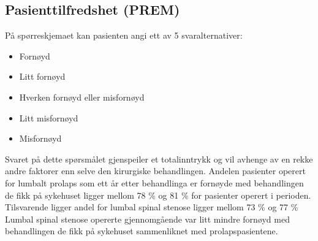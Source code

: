\documentclass [norsk,a4paper,twoside]{article}\usepackage[]{graphicx}\usepackage[]{color}
\begin{document}
      

\subsection{Pasienttilfredshet (PREM)}

På spørreskjemaet kan pasienten angi ett av 5 svaralternativer:
      \begin{itemize}
\item Fornøyd
\item Litt fornøyd
\item Hverken fornøyd eller misfornøyd
\item Litt misfornøyd
\item Misfornøyd
\end{itemize} 

 
Svaret på dette spørsmålet gjenspeiler et totalinntrykk og vil avhenge av en rekke andre faktorer enn selve 
den kirurgiske behandlingen. Andelen pasienter operert for lumbalt prolaps som ett år etter behandlinga er 
fornøyde med behandlingen de fikk på sykehuset  
ligger mellom 78 \% og 81 \% 
      for pasienter operert i perioden. 
Tilsvarende ligger andel for lumbal spinal stenose ligger mellom 73 \% 
og 77 \%
Lumbal spinal stenose opererte gjennomgående var litt mindre fornøyd med behandlingen de fikk på sykehuset sammenliknet med prolapspasientene.





      
\end{document}
